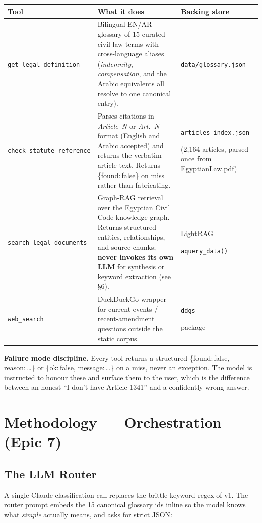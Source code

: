 \documentclass[10pt,a4paper]{article}
\newcommand{\code}[1]{\colorbox{boxbg}{\strut\texttt{\small #1}}}
\begin{document}
\begin{tabularx}{\linewidth}{>{\raggedright\arraybackslash}p{3.6cm} X >{\small\raggedright\arraybackslash}p{4.0cm}}
\toprule
\textbf{Tool} & \textbf{What it does} & \textbf{Backing store} \\
\midrule
\code{get\_legal\_definition} & Bilingual EN/AR glossary of 15 curated civil-law terms with cross-language aliases (\emph{indemnity}, \emph{compensation}, and the Arabic equivalents all resolve to one canonical entry). & \code{data/glossary.json} \\
\rowcolor{rowblue}
\code{check\_statute\_reference} & Parses citations in \emph{Article~N} or \emph{Art.~N} format (English and Arabic accepted) and returns the verbatim article text. Returns \{found:\,false\} on miss rather than fabricating. & \code{articles\_index.json} (2{,}164 articles, parsed once from EgyptianLaw.pdf) \\
\code{search\_legal\_documents} & Graph-RAG retrieval over the Egyptian Civil Code knowledge graph. Returns structured entities, relationships, and source chunks; \textbf{never invokes its own LLM} for synthesis or keyword extraction (see §6). & LightRAG \code{aquery\_data()} \\
\rowcolor{rowblue}
\code{web\_search} & DuckDuckGo wrapper for current-events / recent-amendment questions outside the static corpus. & \code{ddgs} package \\
\bottomrule
\end{tabularx}

\smallskip
\noindent\textbf{Failure mode discipline.} Every tool returns a structured \{found:\,false, reason:\,…\} or \{ok:\,false, message:\,…\} on a miss, never an exception. The model is instructed to honour these and surface them to the user, which is the difference between an honest ``I don't have Article 1341'' and a confidently wrong answer.

\section{Methodology — Orchestration (Epic 7)}

\subsection{The LLM Router}
A single Claude classification call replaces the brittle keyword regex of v1. The router prompt embeds the 15 canonical glossary ids inline so the model knows what \emph{simple} actually means, and asks for strict JSON:
\end{document}
